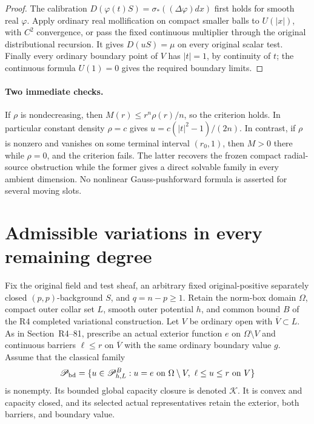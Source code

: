 \documentclass[11pt,a4paper]{article}
\numberwithin{equation}{section}
\theoremstyle{definition}
\theoremstyle{remark}
\begin{document}
\begin{proof}
The calibration
$D(\varphi(t)S)=\sigma_*((\Delta\varphi)dx)$ first holds for smooth
real $\varphi$. Apply ordinary real mollification on compact smaller
balls to $U(|x|)$, with $C^2$ convergence, or pass the fixed
continuous multiplier through the original distributional recursion.
It gives $D(uS)=\mu$ on every original scalar test. Finally every
ordinary boundary point of $V$ has $|t|=1$, by continuity of $t$;
the continuous formula $U(1)=0$ gives the required boundary limits.
\end{proof}

\paragraph{Two immediate checks.}
If $\rho$ is nondecreasing, then
$M(r)\le r^n\rho(r)/n$, so the criterion holds. In particular
constant density $\rho=c$ gives
$u=c(|t|^2-1)/(2n)$. In contrast, if $\rho$ is nonzero and vanishes
on some terminal interval $(r_0,1)$, then $M>0$ there while
$\rho=0$, and the criterion fails. The latter recovers the frozen
compact radial-source obstruction while the former gives a direct
solvable family in every ambient dimension. No nonlinear
Gauss-pushforward formula is asserted for several moving slots.



\section{Admissible variations in every remaining degree}
\label{sec:r6-dirichlet-admissible-variations}

Fix the original field and test sheaf, an arbitrary fixed original-positive
separately closed $(p,p)$-background $S$, and $q=n-p\ge1$. Retain the
norm-box domain $\Omega$, compact outer collar set $L$, smooth outer
potential $h$, and common bound $B$ of the R4 completed variational
construction. Let $V$ be ordinary open with $\overline V\subset L$.
As in Section~\textup{R4--81}, prescribe an actual
exterior function $e$ on $\Omega\setminus V$ and continuous barriers
$\ell\le r$ on $\overline V$ with the same ordinary boundary value $g$.
Assume that the classical family
\[
 \mathscr P_{\rm bd}=
 \{u\in\mathscr P_{h,L}^{B}: u=e\text{ on }\Omega\setminus V,
                                      \ \ell\le u\le r\text{ on }V\}
\]
is nonempty. Its bounded global capacity closure is denoted
$\mathscr K$. It is convex and capacity closed, and its selected actual
representatives retain the exterior, both barriers, and boundary value.
\end{document}
